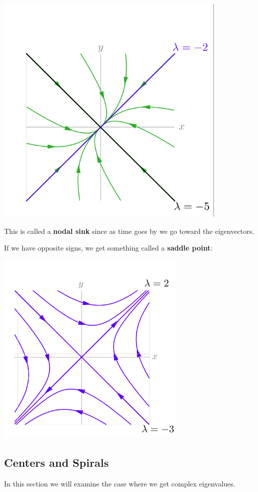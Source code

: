 \documentclass{report}
\begin{document}
\includegraphics[scale=0.5]{nodal_sink.png}

This is called a \textbf{nodal sink} since as time goes by we go toward the eigenvectors.



If we have opposite signs, we get something called a \textbf{saddle point}:

\includegraphics[scale=0.5]{saddle.png}


\subsection{Centers and Spirals}
\label{sec:center}
In this section we will examine the case where we get complex eigenvalues.
\end{document}
